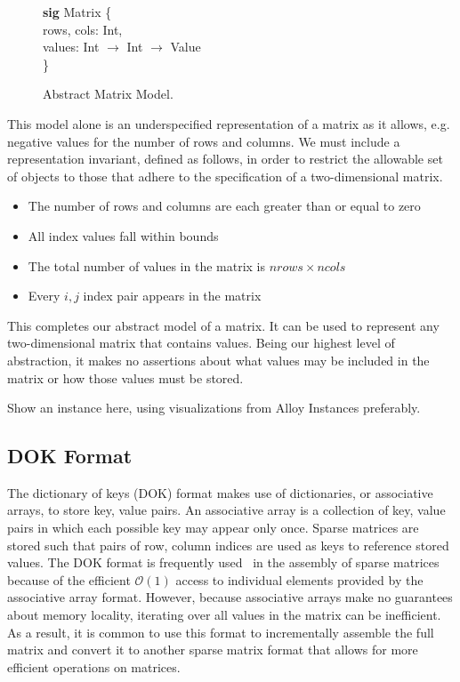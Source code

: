 \documentclass[11pt,conference]{IEEEtran}
\newenvironment{myquote}{\list{}{\leftmargin=12pt\rightmargin=0pt}\item[]}{\endlist}
\def\TA{\makebox[12pt]{}}
\def\Bsig{\textbf{sig} }
\begin{document}
\begin{figure}
\centering
\begin{myquote}
\Bsig Matrix \{\\
\TA  rows, cols: Int,\\
\TA  values: Int $\rightarrow$ Int $\rightarrow$ Value\\
\}
\end{myquote}
\caption{Abstract Matrix Model.}
\label{model:abstract}
\end{figure}

This model alone is an underspecified representation of a matrix as it allows, e.g. negative values for the number of rows and columns.  We must include a representation invariant, defined as follows, in order to restrict the allowable set of objects to those that adhere to the specification of a two-dimensional matrix.

\begin{itemize}
	\item The number of rows and columns are each greater than or equal to zero
	\item All index values fall within bounds
	\item The total number of values in the matrix is \(nrows \times ncols\)
	\item Every \(i, j\) index pair appears in the matrix
\end{itemize}

This completes our abstract model of a matrix.  It can be used to represent any two-dimensional matrix that contains values.  Being our highest level of abstraction, it makes no assertions about what values may be included in the matrix or how those values must be stored.

Show an instance here, using visualizations from Alloy Instances preferably.

\subsection{DOK Format}

The dictionary of keys (DOK) format makes use of dictionaries, or associative arrays, to store key, value pairs.  An associative array is a collection of key, value pairs in which each possible key may appear only once.  Sparse matrices are stored such that pairs of row, column indices are used as keys to reference stored values.  The DOK format is frequently used~\cite{scipy, eigenweb2010} in the assembly of sparse matrices because of the efficient \(\mathcal{O}(1)\) access to individual elements provided by the associative array format.  However, because associative arrays make no guarantees about memory locality, iterating over all values in the matrix can be inefficient.  As a result, it is common to use this format to incrementally assemble the full matrix and convert it to another sparse matrix format that allows for more efficient operations on matrices.
\end{document}
